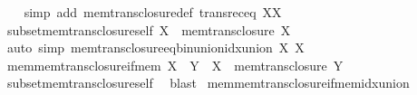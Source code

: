 \begin{isabellebody}
%
\isadelimproof
\ \ %
\endisadelimproof
%
\isatagproof
{}\isamarkupfalse%
\ {\isacharparenleft}{\kern0pt}simp\ add{\isacharcolon}{\kern0pt}\ mem{\isacharunderscore}{\kern0pt}trans{\isacharunderscore}{\kern0pt}closure{\isacharunderscore}{\kern0pt}def\ transrec{\isacharunderscore}{\kern0pt}eq{\isacharbrackleft}{\kern0pt}\ {\isacharquery}{\kern0pt}X{\isacharequal}{\kern0pt}X{\isacharbrackright}{\kern0pt}{\isacharparenright}{\kern0pt}%
\endisatagproof
{\isafoldproof}%
%
\isadelimproof
\isanewline
%
\endisadelimproof
\isanewline
{}\isamarkupfalse%
\ subset{\isacharunderscore}{\kern0pt}mem{\isacharunderscore}{\kern0pt}trans{\isacharunderscore}{\kern0pt}closure{\isacharunderscore}{\kern0pt}self{\isacharcolon}{\kern0pt}\ {\isachardoublequoteopen}X\ {\isasymsubseteq}\ mem{\isacharunderscore}{\kern0pt}trans{\isacharunderscore}{\kern0pt}closure\ X{\isachardoublequoteclose}\isanewline
%
\isadelimproof
\ \ %
\endisadelimproof
%
\isatagproof
{}\isamarkupfalse%
\ {\isacharparenleft}{\kern0pt}auto\ simp{\isacharcolon}{\kern0pt}\ mem{\isacharunderscore}{\kern0pt}trans{\isacharunderscore}{\kern0pt}closure{\isacharunderscore}{\kern0pt}eq{\isacharunderscore}{\kern0pt}bin{\isacharunderscore}{\kern0pt}union{\isacharunderscore}{\kern0pt}idx{\isacharunderscore}{\kern0pt}union{\isacharbrackleft}{\kern0pt}\ {\isacharquery}{\kern0pt}X{\isacharequal}{\kern0pt}\ X{\isacharbrackright}{\kern0pt}{\isacharparenright}{\kern0pt}%
\endisatagproof
{\isafoldproof}%
%
\isadelimproof
\isanewline
%
\endisadelimproof
\isanewline
{}\isamarkupfalse%
\ mem{\isacharunderscore}{\kern0pt}mem{\isacharunderscore}{\kern0pt}trans{\isacharunderscore}{\kern0pt}closure{\isacharunderscore}{\kern0pt}if{\isacharunderscore}{\kern0pt}mem{\isacharcolon}{\kern0pt}\ {\isachardoublequoteopen}X\ {\isasymin}\ Y\ {\isasymLongrightarrow}\ X\ {\isasymin}\ mem{\isacharunderscore}{\kern0pt}trans{\isacharunderscore}{\kern0pt}closure\ Y{\isachardoublequoteclose}\isanewline
%
\isadelimproof
\ \ %
\endisadelimproof
%
\isatagproof
{}\isamarkupfalse%
\ subset{\isacharunderscore}{\kern0pt}mem{\isacharunderscore}{\kern0pt}trans{\isacharunderscore}{\kern0pt}closure{\isacharunderscore}{\kern0pt}self\ \isamarkupfalse%
\ blast%
\endisatagproof
{\isafoldproof}%
%
\isadelimproof
\isanewline
%
\endisadelimproof
\isanewline
{}\isamarkupfalse%
\ mem{\isacharunderscore}{\kern0pt}mem{\isacharunderscore}{\kern0pt}trans{\isacharunderscore}{\kern0pt}closure{\isacharunderscore}{\kern0pt}if{\isacharunderscore}{\kern0pt}mem{\isacharunderscore}{\kern0pt}idx{\isacharunderscore}{\kern0pt}union{\isacharcolon}{\kern0pt}\isanewline

\end{isabellebody}
